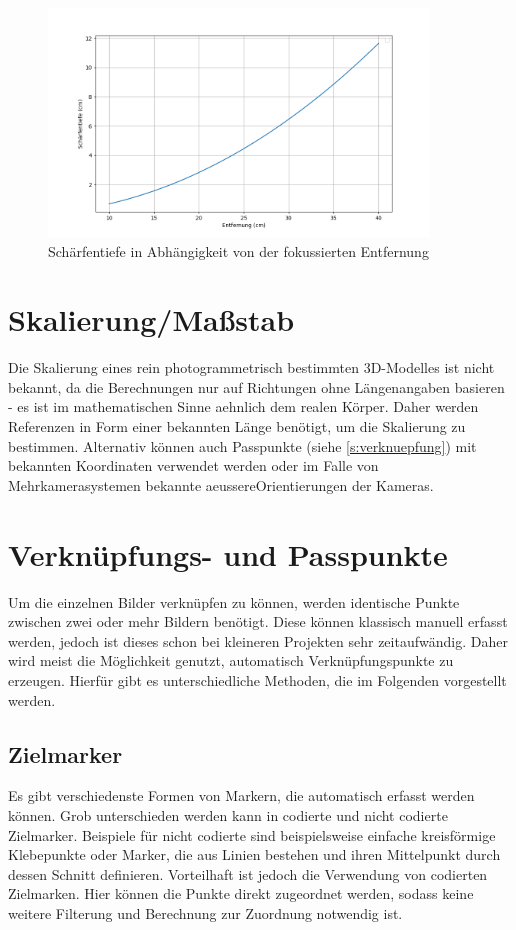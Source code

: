\documentclass[./00PhotoBox.tex]{subfiles}
\begin{document}
\begin{figure}
    \centering
    \includegraphics[width=0.9\textwidth]{./img/2_grundlagen/schaerfentiefe_plot.png}
    \caption{Schärfentiefe in Abhängigkeit von der fokussierten Entfernung}
    \label{img:sschaerfentiefe_plot}
\end{figure}


\section{Skalierung/Maßstab}
\label{sec:massstab}
Die Skalierung eines rein photogrammetrisch bestimmten 3D-Modelles ist nicht bekannt, da die Berechnungen nur auf Richtungen ohne Längenangaben basieren - es ist im mathematischen Sinne \gls{aehnlich} dem realen Körper. Daher werden Referenzen in Form einer bekannten Länge benötigt, um die Skalierung zu bestimmen. Alternativ können auch Passpunkte (siehe \autoref{s:verknuepfung}) mit bekannten Koordinaten verwendet werden oder im Falle von Mehrkamerasystemen bekannte \gls{aeussereOrientierung}en der Kameras. \citep[vgl.][S. 546]{luhmann}


\section{Verknüpfungs- und Passpunkte}
\label{s:verknuepfung}
Um die einzelnen Bilder verknüpfen zu können, werden identische Punkte zwischen zwei oder mehr Bildern benötigt. Diese können klassisch manuell erfasst werden, jedoch ist dieses schon bei kleineren Projekten sehr zeitaufwändig. Daher wird meist die Möglichkeit genutzt, automatisch Verknüpfungspunkte zu erzeugen. Hierfür gibt es unterschiedliche Methoden, die im Folgenden vorgestellt werden.


\subsection{Zielmarker}
Es gibt verschiedenste Formen von Markern, die automatisch erfasst werden können. Grob unterschieden werden kann in codierte und nicht codierte Zielmarker. Beispiele für nicht codierte sind beispielsweise einfache kreisförmige Klebepunkte oder Marker, die aus Linien bestehen und ihren Mittelpunkt durch dessen Schnitt definieren.
Vorteilhaft ist jedoch die Verwendung von codierten Zielmarken. Hier können die Punkte direkt zugeordnet werden, sodass keine weitere Filterung und Berechnung zur Zuordnung notwendig ist. \citep[vgl.][S.535ff]{luhmann}
\end{document}
